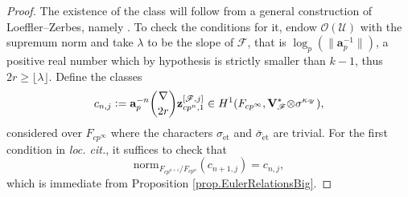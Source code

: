 \documentclass[a4paper]{amsart}
\numberwithin{equation}{section}
\theoremstyle{definition}
\newcommand{\defeq}{\vcentcolon=}
\DeclareMathOperator{\et}{\text{\'et}}
\newcommand{\norm}{\mathrm{norm}}
\renewcommand{\et}{\mathrm{\acute{e}t}}
\begin{document}
\begin{proof}
The existence of the class will follow from a general construction of Loeffler--Zerbes, namely \cite[Proposition 2.3.3]{LoefflerZerbes.Rankin}. To check the conditions for it, endow $\mathcal{O}(\mathscr{U})$ with the supremum norm and take $\lambda$ to be the slope of $\mathscr{F}$, that is $\log_p(\|\mathbf{a}_p^{-1}\|)$, a positive real number which by hypothesis is strictly smaller than $k-1$, thus $2r\ge\lfloor\lambda\rfloor$. Define the classes \[c_{n,j}\defeq \mathbf{a}_p^{-n}\binom{\nabla}{2r}\mathbf{z}^{[\mathscr{F},j]}_{cp^n,1}\in H^1(F_{cp^\infty},\mathbf{V}_\mathscr{F}^\ast{\otimes}\sigma^{\kappa_{{\mathscr{U}}}}),\]
considered over $F_{cp^\infty}$ where the characters $\sigma_{\et}$ and $\bar{\sigma}_{\et}$ are trivial. For the first condition in \textit{loc. cit.}, it suffices to check that \[\norm_{F_{cp^{n+1}}/F_{cp^n}}(c_{n+1,j})=c_{n,j},\] which is immediate from Proposition \ref{prop.EulerRelationsBig}.


\end{proof}
\end{document}
